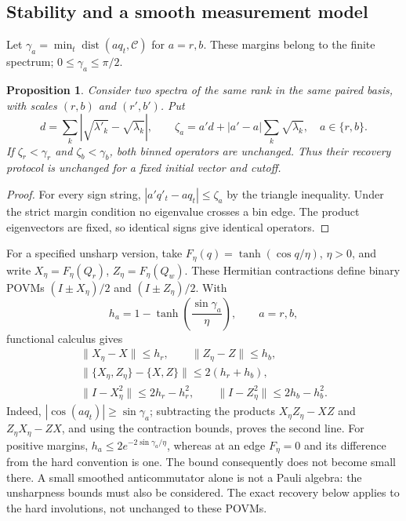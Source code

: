\documentclass[11pt,a4paper]{article}
\newtheorem{proposition}{Proposition}
\begin{document}
\subsection{Stability and a smooth measurement model}
\label{sec:robustness}
Let $\gamma_a=\min_t\operatorname{dist}(a q_t,\mathcal C)$ for $a=r,b$. These margins belong to the finite spectrum; $0\le\gamma_a\le\pi/2$.
\begin{proposition}
\label{prop:margin}
Consider two spectra of the same rank in the same paired basis, with scales $(r,b)$ and $(r',b')$. Put
\begin{equation}
d=\sum_k|\sqrt{\lambda'_k}-\sqrt{\lambda_k}|,\qquad
\zeta_a=a'd+|a'-a|\sum_k\sqrt{\lambda_k},\quad a\in\{r,b\}.
\label{eq:margin}
\end{equation}
If $\zeta_r<\gamma_r$ and $\zeta_b<\gamma_b$, both binned operators are unchanged. Thus their recovery protocol is unchanged for a fixed initial vector and cutoff.
\end{proposition}
\begin{proof}
For every sign string, $|a'q'_t-aq_t|\le\zeta_a$ by the triangle inequality. Under the strict margin condition no eigenvalue crosses a bin edge. The product eigenvectors are fixed, so identical signs give identical operators.
\end{proof}

For a specified unsharp version, take $F_\eta(q)=\tanh(\cos q/\eta)$, $\eta>0$, and write $X_\eta=F_\eta(Q_r)$, $Z_\eta=F_\eta(Q_w)$. These Hermitian contractions define binary POVMs $(I\pm X_\eta)/2$ and $(I\pm Z_\eta)/2$. With
\begin{equation}
h_a=1-\tanh\!\left(\frac{\sin\gamma_a}{\eta}\right),\qquad a=r,b,
\label{eq:smoothh}
\end{equation}
functional calculus gives
\begin{equation}
\begin{gathered}
\|X_\eta-X\|\le h_r,\qquad \|Z_\eta-Z\|\le h_b,\\
\|\{X_\eta,Z_\eta\}-\{X,Z\}\|\le2(h_r+h_b),\\
\|I-X_\eta^2\|\le2h_r-h_r^2,\qquad
\|I-Z_\eta^2\|\le2h_b-h_b^2.
\end{gathered}
\label{eq:smoothbounds}
\end{equation}
Indeed, $|\cos(aq_t)|\ge\sin\gamma_a$; subtracting the products $X_\eta Z_\eta-XZ$ and $Z_\eta X_\eta-ZX$, and using the contraction bounds, proves the second line. For positive margins, $h_a\le2e^{-2\sin\gamma_a/\eta}$, whereas at an edge $F_\eta=0$ and its difference from the hard convention is one. The bound consequently does not become small there. A small smoothed anticommutator alone is not a Pauli algebra: the unsharpness bounds must also be considered. The exact recovery below applies to the hard involutions, not unchanged to these POVMs.
\end{document}
